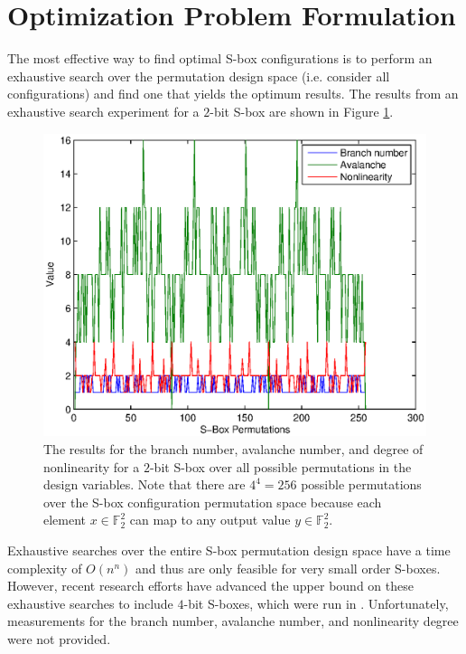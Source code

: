 \documentclass[11pt]{article}
\newcommand{\field}[1]{\mathbb{#1}} %
\begin{document}
\section{Optimization Problem Formulation}

The most effective way to find optimal S-box configurations is to perform an exhaustive search over the permutation design space (i.e. consider all configurations) and find one that yields the optimum results. The results from an exhaustive search experiment for a $2$-bit S-box are shown in Figure \ref{bfjoint}.
\begin{figure}[!ht]
	\centering
	\includegraphics[scale=0.65]{images/brute_joint.eps} 

	\caption{The results for the branch number, avalanche number, and degree of nonlinearity for a $2$-bit S-box over all possible permutations in the design variables. Note that there are $4^4 = 256$ possible permutations over the S-box configuration permutation space because each element $x \in \field{F}_2^2$ can map to any output value $y \in \field{F}_2^2$.}
	\label{bfjoint}
\end{figure}
Exhaustive searches over the entire S-box permutation design space have a time complexity of $O(n^n)$ and thus are only feasible for very small order S-boxes. However, recent research efforts have advanced the upper bound on these exhaustive searches to include $4$-bit S-boxes, which were run in \cite{Sbox4x4}. Unfortunately, measurements for the branch number, avalanche number, and nonlinearity degree were not provided. 
\end{document}
